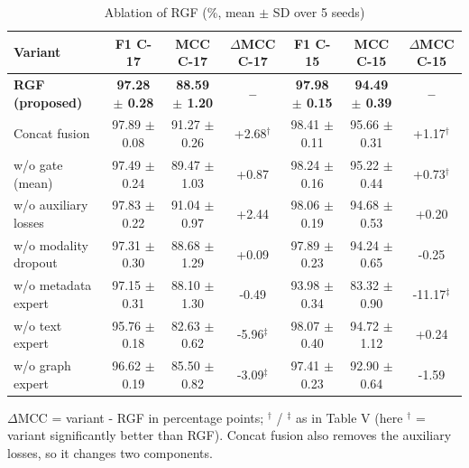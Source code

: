 \begin{table}[!t]
\caption{Ablation of RGF (\%, mean $\pm$ SD over 5 seeds)}
\label{tab:ablation}
\centering\footnotesize
\setlength{\tabcolsep}{3pt}
\begin{tabular}{lcccccc}
\hline
Variant & F1 C-17 & MCC C-17 & $\Delta$MCC C-17 & F1 C-15 & MCC C-15 & $\Delta$MCC C-15 \\
\hline
\textbf{RGF (proposed)} & \textbf{97.28 $\pm$ 0.28} & \textbf{88.59 $\pm$ 1.20} & \textbf{--} & \textbf{97.98 $\pm$ 0.15} & \textbf{94.49 $\pm$ 0.39} & \textbf{--} \\
Concat fusion & 97.89 $\pm$ 0.08 & 91.27 $\pm$ 0.26 & +2.68$^\dagger$ & 98.41 $\pm$ 0.11 & 95.66 $\pm$ 0.31 & +1.17$^\dagger$ \\
w/o gate (mean) & 97.49 $\pm$ 0.24 & 89.47 $\pm$ 1.03 & +0.87 & 98.24 $\pm$ 0.16 & 95.22 $\pm$ 0.44 & +0.73$^\dagger$ \\
w/o auxiliary losses & 97.83 $\pm$ 0.22 & 91.04 $\pm$ 0.97 & +2.44 & 98.06 $\pm$ 0.19 & 94.68 $\pm$ 0.53 & +0.20 \\
w/o modality dropout & 97.31 $\pm$ 0.30 & 88.68 $\pm$ 1.29 & +0.09 & 97.89 $\pm$ 0.23 & 94.24 $\pm$ 0.65 & -0.25 \\
w/o metadata expert & 97.15 $\pm$ 0.31 & 88.10 $\pm$ 1.30 & -0.49 & 93.98 $\pm$ 0.34 & 83.32 $\pm$ 0.90 & -11.17$^\ddagger$ \\
w/o text expert & 95.76 $\pm$ 0.18 & 82.63 $\pm$ 0.62 & -5.96$^\ddagger$ & 98.07 $\pm$ 0.40 & 94.72 $\pm$ 1.12 & +0.24 \\
w/o graph expert & 96.62 $\pm$ 0.19 & 85.50 $\pm$ 0.82 & -3.09$^\ddagger$ & 97.41 $\pm$ 0.23 & 92.90 $\pm$ 0.64 & -1.59 \\
\hline
\end{tabular}
\par\smallskip\parbox{\linewidth}{\scriptsize $\Delta$MCC = variant - RGF in percentage points; $^\dagger$ / $^\ddagger$ as in Table V (here $^\dagger$ = variant significantly better than RGF). Concat fusion also removes the auxiliary losses, so it changes two components.}
\end{table}